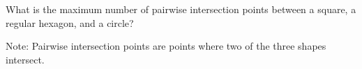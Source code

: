 What is the maximum number of pairwise intersection points between a square, a regular hexagon, and a circle?



Note: Pairwise intersection points are points where two of the three shapes intersect.

